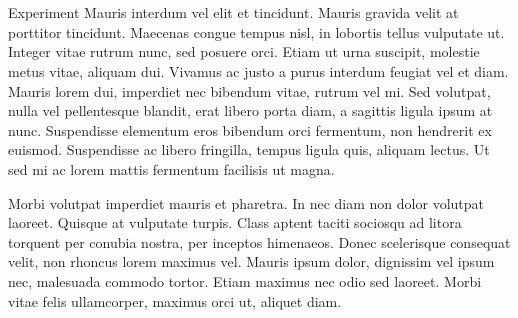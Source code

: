 \documentclass[12pt]{beamer}
\renewcommand{\maketitle}{%
	\begin{center}%
		\Huge\inserttitle\\[7mm]%
		\Large\insertauthor\\[5mm]%
		\Large\insertinstitute%
	\end{center}%
	\vspace*{-2ex}%
}
\begin{document}
\begin{frame}{\maketitle}
\begin{columns}
\begin{column}{.45\textwidth}
\begin{block}{Experiment}
					Mauris interdum vel elit et tincidunt. Mauris gravida velit at porttitor tincidunt. Maecenas congue tempus nisl, in lobortis tellus vulputate ut. Integer vitae rutrum nunc, sed posuere orci. Etiam ut urna suscipit, molestie metus vitae, aliquam dui. Vivamus ac justo a purus interdum feugiat vel et diam. Mauris lorem dui, imperdiet nec bibendum vitae, rutrum vel mi. Sed volutpat, nulla vel pellentesque blandit, erat libero porta diam, a sagittis ligula ipsum at nunc. Suspendisse elementum eros bibendum orci fermentum, non hendrerit ex euismod. Suspendisse ac libero fringilla, tempus ligula quis, aliquam lectus. Ut sed mi ac lorem mattis fermentum facilisis ut magna.

					Morbi volutpat imperdiet mauris et pharetra. In nec diam non dolor volutpat laoreet. Quisque at vulputate turpis. Class aptent taciti sociosqu ad litora torquent per conubia nostra, per inceptos himenaeos. Donec scelerisque consequat velit, non rhoncus lorem maximus vel. Mauris ipsum dolor, dignissim vel ipsum nec, malesuada commodo tortor. Etiam maximus nec odio sed laoreet. Morbi vitae felis ullamcorper, maximus orci ut, aliquet diam.


\end{block}
\end{column}
\end{columns}
\end{frame}
\end{document}
